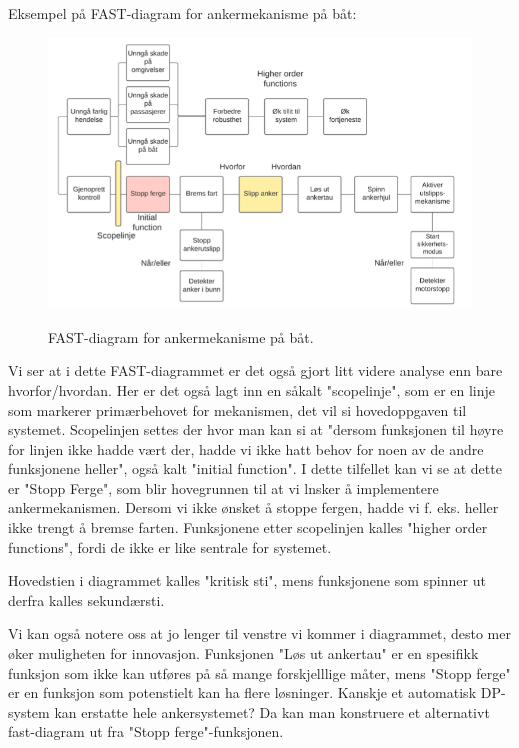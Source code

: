 Eksempel på FAST-diagram for ankermekanisme på båt:

\begin{figure}[H]
    \centering
        \includegraphics[width=\textwidth]{figures/FAST/Skjermbilde 2021-11-24 kl. 09.28.51.png}\\
        \caption{FAST-diagram for ankermekanisme på båt.}
\end{figure}

Vi ser at i dette FAST-diagrammet er det også gjort litt videre analyse enn bare hvorfor/hvordan. Her er det også lagt inn en såkalt "scopelinje", som er en linje som markerer primærbehovet for mekanismen, det vil si hovedoppgaven til systemet. Scopelinjen settes der hvor man kan si at "dersom funksjonen til høyre for linjen ikke hadde vært der, hadde vi ikke hatt behov for noen av de andre funksjonene heller", også kalt "initial function". I dette tilfellet kan vi se at dette er "Stopp Ferge", som blir hovegrunnen til at vi lnsker å implementere ankermekanismen. Dersom vi ikke ønsket å stoppe fergen, hadde vi f. eks. heller ikke trengt å bremse farten. Funksjonene etter scopelinjen kalles "higher order functions", fordi de ikke er like sentrale for systemet.

Hovedstien i diagrammet kalles "kritisk sti", mens funksjonene som spinner ut derfra kalles sekundærsti.

Vi kan også notere oss at jo lenger til venstre vi kommer i diagrammet, desto mer øker muligheten for innovasjon. Funksjonen "Løs ut ankertau" er en spesifikk funksjon som ikke kan utføres på så mange forskjelllige måter, mens "Stopp ferge" er en funksjon som potenstielt kan ha flere løsninger. Kanskje et automatisk DP-system kan erstatte hele ankersystemet? Da kan man konstruere et alternativt fast-diagram ut fra "Stopp ferge"-funksjonen.

